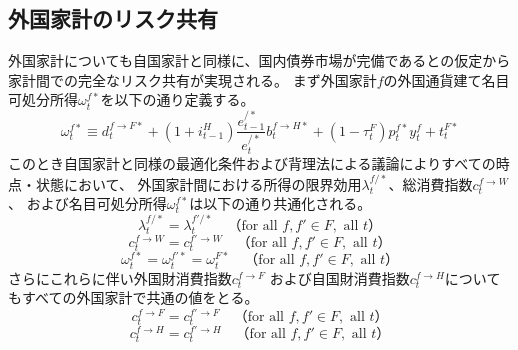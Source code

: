 \subsection{外国家計のリスク共有}
\label{sec:chapter3_risk_sharing_commonization_foreign}
外国家計についても自国家計と同様に、国内債券市場が完備であるとの仮定から家計間での完全なリスク共有が実現される。
まず外国家計\(f\)の外国通貨建て名目可処分所得\(\omega_t^{f*}\)を以下の通り定義する。
\begin{equation}
\label{form:chapter3_risk_sharing_commonization_foreign_omega_star_def}
\omega_t^{f*}\equiv d_t^{f\to F*}+(1+i_{t-1}^H)\frac{e_{t-1}^{/*}}{e_t^{/*}}b_t^{f\to H*}+(1-\tau_t^F)p_t^{f*}y_t^f+t_t^{F*}
\end{equation}
このとき自国家計と同様の最適化条件および背理法による議論によりすべての時点・状態において、
外国家計間における所得の限界効用\(\lambda_t^{f/*}\)、総消費指数\(c_t^{f\to W}\)、
および名目可処分所得\(\omega_t^{f*}\)は以下の通り共通化される。
\begin{equation}
\label{form:chapter3_risk_sharing_commonization_foreign_lambda_f_slash_star_equality_eq}
\lambda_t^{f/*}=\lambda_t^{f'/*}\quad（\text{for all }f,f'\in F,\text{ all }t）
\end{equation}
\begin{equation}
\label{form:chapter3_risk_sharing_commonization_foreign_c_f_W_equality_eq}
c_t^{f\to W}=c_t^{f'\to W}\quad（\text{for all }f,f'\in F,\text{ all }t）
\end{equation}
\begin{equation}
\label{form:chapter3_risk_sharing_commonization_foreign_omega_star_equality_eq}
\omega_t^{f*}=\omega_t^{f'*}=\omega_t^{F*}\quad（\text{for all }f,f'\in F,\text{ all }t）
\end{equation}
さらにこれらに伴い外国財消費指数\(c_t^{f\to F}\)
および自国財消費指数\(c_t^{f\to H}\)についてもすべての外国家計で共通の値をとる。
\begin{equation}
\label{form:chapter3_risk_sharing_commonization_foreign_c_f_F_equality_eq}
c_t^{f\to F}=c_t^{f'\to F}\quad（\text{for all }f,f'\in F,\text{ all }t）
\end{equation}
\begin{equation}
\label{form:chapter3_risk_sharing_commonization_foreign_c_f_H_equality_eq}
c_t^{f\to H}=c_t^{f'\to H}\quad（\text{for all }f,f'\in F,\text{ all }t）
\end{equation}